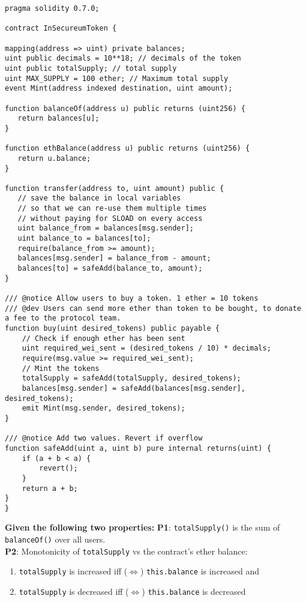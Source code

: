 \begin{lstlisting}[language=Solidity, style=solStyle]
pragma solidity 0.7.0;

contract InSecureumToken {

mapping(address => uint) private balances;
uint public decimals = 10**18; // decimals of the token
uint public totalSupply; // total supply
uint MAX_SUPPLY = 100 ether; // Maximum total supply
event Mint(address indexed destination, uint amount);

function balanceOf(address u) public returns (uint256) {
   return balances[u];
}

function ethBalance(address u) public returns (uint256) {
   return u.balance;
}

function transfer(address to, uint amount) public {
   // save the balance in local variables
   // so that we can re-use them multiple times
   // without paying for SLOAD on every access
   uint balance_from = balances[msg.sender];
   uint balance_to = balances[to];
   require(balance_from >= amount);
   balances[msg.sender] = balance_from - amount;
   balances[to] = safeAdd(balance_to, amount);
}

/// @notice Allow users to buy a token. 1 ether = 10 tokens
/// @dev Users can send more ether than token to be bought, to donate a fee to the protocol team.
function buy(uint desired_tokens) public payable {
    // Check if enough ether has been sent
    uint required_wei_sent = (desired_tokens / 10) * decimals;
    require(msg.value >= required_wei_sent);
    // Mint the tokens
    totalSupply = safeAdd(totalSupply, desired_tokens);
    balances[msg.sender] = safeAdd(balances[msg.sender], desired_tokens);
    emit Mint(msg.sender, desired_tokens);
}

/// @notice Add two values. Revert if overflow
function safeAdd(uint a, uint b) pure internal returns(uint) {
    if (a + b < a) {
        revert();
    }
    return a + b;
}
}
\end{lstlisting}

\textbf{Given the following two properties:}
\textbf{P1}: \verb|totalSupply()| is the sum of \verb|balanceOf()| over all users.\\
\textbf{P2}: Monotonicity of \verb|totalSupply| vs the contract's ether balance:
\begin{enumerate}[label=(\alph*)]
    \item\verb|totalSupply| is increased iff ($\Leftrightarrow$) \verb|this.balance| is increased and
    \item\verb|totalSupply| is decreased iff ($\Leftrightarrow$) \verb|this.balance| is decreased
\end{enumerate}

